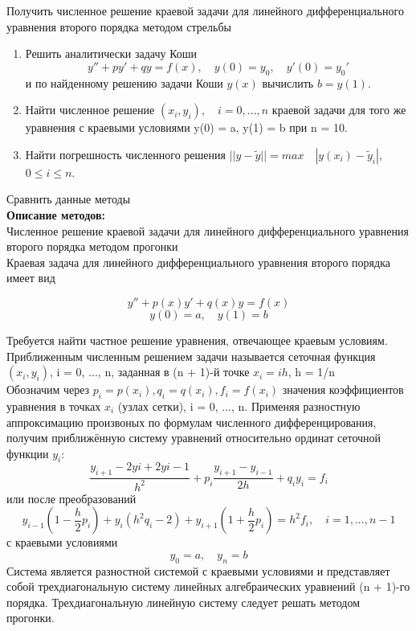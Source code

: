 \documentclass [12pt]{article}
\begin{document}
Получить численное решение краевой задачи для линейного дифференциального уравнения второго порядка методом стрельбы

\begin{enumerate}
    \item Решить аналитически задачу Коши $$y'' + py' + qy = f(x), \quad y(0) = y_0, \quad y'(0) = y_0'$$ и по найденному решению задачи Коши $y(x)$ вычислить $b=y(1)$.
    \item Найти численное решение $(x_i, y_i), \quad i = 0, ..., n$ краевой задачи для того же уравнения с краевыми условиями y(0) = a, y(1) = b при n = 10.
    \item Найти погрешность численного решения $||y - \widetilde{y}|| = max \quad |y(x_i) - \widetilde{y}_i|$, \quad $0 \leq i \leq n$.
\end{enumerate}

Сравнить данные методы\\

\textbf{Описание методов:}\\

Численное решение краевой задачи для линейного дифференциального уравнения второго порядка методом прогонки\\
Краевая задача для линейного дифференциального уравнения второго порядка имеет вид

$$y'' + p(x)y' + q(x)y = f(x)$$
$$y(0) = a, \quad y(1) = b$$

Требуется найти частное решение уравнения, отвечающее краевым условиям.\\
Приближенным численным решением задачи называется сеточная функция $(x_i, y_i)$, i = 0, ..., n, заданная в (n + 1)-й точке $x_i = ih$, h = 1/n\\
Обозначим через $p_i = p(x_i), q_i = q(x_i), f_i = f(x_i)$ значения коэффициентов уравнения в точках $x_i$ (узлах сетки), i = 0, ..., n. Применяя разностную аппроксимацию произвоных по формулам численного дифференцирования, получим приближённую систему уравнений относительно ординат сеточной функции $y_i$:
$$\frac{y_{i + 1} - 2y{i} + 2y{i - 1}}{h^{2}} + p_i\frac{y_{i + 1} - y_{i - 1}}{2h} + q_iy_i = f_i$$
или после преобразований
$$y_{i - 1}(1 - \frac{h}{2}p_i) + y_i(h^2q_i - 2) + y_{i + 1}(1 + \frac{h}{2}p_i) = h^2f_i, \quad i = 1, ..., n - 1$$
с краевыми условиями
$$y_0 = a, \quad y_n = b$$
Система является разностной системой с краевыми условиями и представляет собой трехдиагональную систему линейных алгебраических уравнений (n + 1)-го порядка. Трехдиагональную линейную систему следует решать методом прогонки.\\
\end{document}
